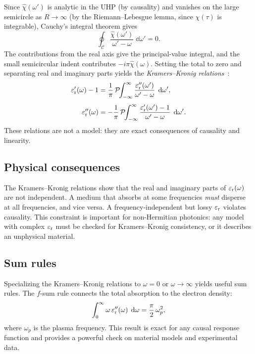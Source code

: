 Since $\hat{\chi}(\omega')$ is analytic in the UHP (by causality) and
vanishes on the large semicircle as $R \to \infty$ (by the Riemann--Lebesgue
lemma, since $\chi(\tau)$ is integrable), Cauchy's integral theorem gives
\begin{equation}
 \oint_{\mathcal{C}} \frac{\hat{\chi}(\omega')}{\omega'-\omega}\;\dd\omega' = 0.
 \label{eq:cauchy-contour}
\end{equation}
The contributions from the real axis give the principal-value integral,
and the small semicircular indent contributes $-i\pi\hat{\chi}(\omega)$.
Setting the total to zero and separating real and imaginary parts yields
the \emph{Kramers--Kronig relations}~\cite{sols2021functional}:
\begin{align}
 \varepsilon_{\mathrm{r}}'(\omega) - 1 &= \frac{1}{\pi}\,\mathcal{P}\!\!
 \int_{-\infty}^{\infty}\frac{\varepsilon_{\mathrm{r}}''(\omega')}{\omega' - \omega}
 \;\mathop{}\!\mathrm{d}\omega',
 \label{eq:kk-real}\\[4pt]
 \varepsilon_{\mathrm{r}}''(\omega) &= -\frac{1}{\pi}\,\mathcal{P}\!\!
 \int_{-\infty}^{\infty}\frac{\varepsilon_{\mathrm{r}}'(\omega') - 1}{\omega' - \omega}
 \;\mathop{}\!\mathrm{d}\omega'.
 \label{eq:kk-imag}
\end{align}
These relations are not a model: they are exact consequences of causality
and linearity.

\subsection{Physical consequences}
\label{ssec:kk-physics}

\begin{takeaway}
The Kramers--Kronig relations show that the real and imaginary parts of
$\varepsilon_{\mathrm{r}}(\omega)$ are not independent. A medium that absorbs at some
frequencies \emph{must} disperse at all frequencies, and vice versa.
A frequency-independent but lossy $\varepsilon_{\mathrm{r}}$ violates causality. This
constraint is important for non-Hermitian photonics: any model with
complex $\varepsilon_{\mathrm{r}}$ must be checked for Kramers--Kronig consistency, or it
describes an unphysical material.
\end{takeaway}

\subsection{Sum rules}
\label{ssec:sum-rules}

Specializing the Kramers--Kronig relations to $\omega = 0$ or
$\omega \to \infty$ yields useful sum rules. The $f$-sum rule connects
the total absorption to the electron density:
\begin{equation}
 \int_0^\infty \omega\,\varepsilon_{\mathrm{r}}''(\omega)\;\mathop{}\!\mathrm{d}\omega
 = \frac{\pi}{2}\,\omega_p^2,
 \label{eq:f-sum-rule}
\end{equation}
where $\omega_p$ is the plasma frequency. This result is exact for any
causal response function and provides a powerful check on material models
and experimental data.

